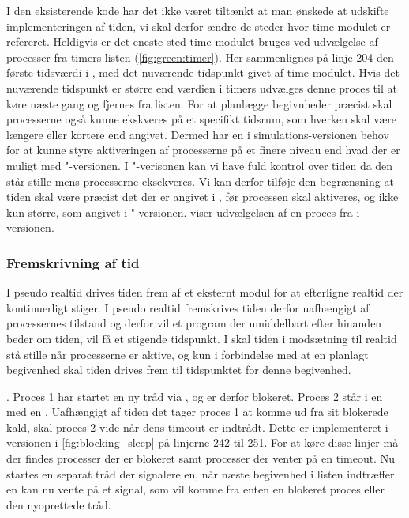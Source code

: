 I den eksisterende kode har det ikke været tiltænkt at man ønskede at udskifte implementeringen af tiden, vi skal derfor ændre de steder hvor time modulet er refereret. Heldigvis er det eneste sted time modulet bruges  ved udvælgelse af processer fra timers listen (\cref{fig:green:timer}). 
Her sammenlignes på linje 204 den første tidsværdi i , med det nuværende tidspunkt givet af time modulet.
Hvis det nuværende tidspunkt er større end værdien i timers udvælges denne proces til at køre næste gang og fjernes fra listen.
For at planlægge begivnheder præcist skal processerne også kunne ekskveres på et specifikt tidsrum, som hverken skal være længere eller kortere end angivet. Dermed har  \sched en i simulations-versionen behov for at kunne  styre aktiveringen af processerne på et finere niveau end hvad der er muligt med "-versionen.  
I "-verisonen kan vi have fuld kontrol over tiden da  den står stille mens processerne eksekveres.
Vi kan derfor tilføje den begrænsning at tiden skal være præcist det der er angivet i , før processen skal aktiveres, og ikke kun større, som angivet i "-versionen.  viser udvælgelsen af en proces fra  i -versionen. 



\subsubsection{Fremskrivning af tid}

I pseudo realtid drives tiden frem af et eksternt modul for at efterligne realtid der kontinuerligt stiger. I pseudo realtid fremskrives tiden derfor uafhængigt af processernes tilstand og derfor vil et program der umiddelbart efter hinanden beder om tiden, vil  få et stigende  tidspunkt. I \des  skal tiden i modsætning til realtid stå stille når processerne er aktive, og kun i forbindelse med at en planlagt begivenhed skal tiden drives frem til tidspunktet for denne begivenhed.

. Proces 1 har startet en ny tråd via , og er derfor blokeret. Proces 2 står i en  med en . Uafhængigt af tiden det tager proces 1 at komme ud fra sit blokerede kald, skal proces 2 vide når dens timeout er indtrådt. Dette er implementeret i -versionen i \cref{fig:blocking_sleep} på linjerne 242 til 251. For at køre disse linjer må  der findes processer der er blokeret samt processer der venter på en timeout. Nu startes en separat tråd der signalere \sched en, når næste begivenhed i  listen indtræffer. \Sched en kan nu vente på et signal, som vil komme fra enten en blokeret proces eller den nyoprettede tråd.

